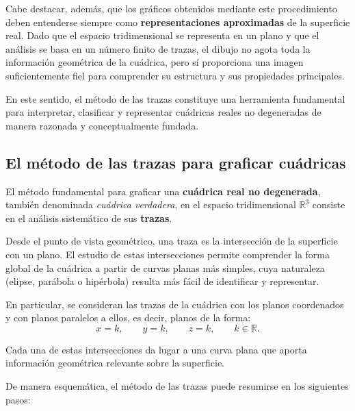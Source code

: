 \documentclass[11pt]{article}
\begin{document}
Cabe destacar, además, que los gráficos obtenidos mediante este procedimiento deben entenderse siempre como \textbf{representaciones aproximadas} de la superficie real. Dado que el espacio tridimensional se representa en un plano y que el análisis se basa en un número finito de trazas, el dibujo no agota toda la información geométrica de la cuádrica, pero sí proporciona una imagen suficientemente fiel para comprender su estructura y sus propiedades principales.

En este sentido, el método de las trazas constituye una herramienta fundamental para interpretar, clasificar y representar cuádricas reales no degeneradas de manera razonada y conceptualmente fundada.


\subsection*{El método de las trazas para graficar cuádricas}

El método fundamental para graficar una \textbf{cuádrica real no degenerada}, también denominada \emph{cuádrica verdadera}, en el espacio tridimensional $\mathbb{R}^3$ consiste en el análisis sistemático de sus \textbf{trazas}.

Desde el punto de vista geométrico, una traza es la intersección de la superficie con un plano. El estudio de estas intersecciones permite comprender la forma global de la cuádrica a partir de curvas planas más simples, cuya naturaleza (elipse, parábola o hipérbola) resulta más fácil de identificar y representar.

En particular, se consideran las trazas de la cuádrica con los planos coordenados y con planos paralelos a ellos, es decir, planos de la forma:
\[
x = k, \qquad y = k, \qquad z = k, \qquad k \in \mathbb{R}.
\]

Cada una de estas intersecciones da lugar a una curva plana que aporta información geométrica relevante sobre la superficie.

\medskip

De manera esquemática, el método de las trazas puede resumirse en los siguientes pasos:
\end{document}

